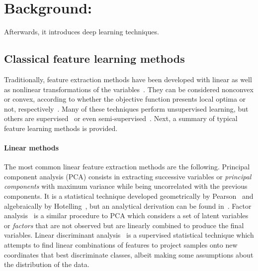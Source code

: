 

\section{Background: }\label{sec:bg}

 Afterwards, it introduces deep learning techniques.

\subsection{Classical feature learning methods}

Traditionally, feature extraction methods have been developed with linear as well as nonlinear transformations of the variables~. They can be considered nonconvex or convex, according to whether the objective function presents local optima or not, respectively~. Many of these techniques perform unsupervised learning, but others are supervised~ or even semi-supervised~. Next, a summary of typical feature learning methods is provided.

\paragraph{Linear methods} The most common linear feature extraction methods are the following. Principal component analysis (PCA) consists in extracting successive variables or \textit{principal components} with maximum variance while being uncorrelated with the previous components. It is a statistical technique developed geometrically by Pearson~ and algebraically by Hotelling~, but an analytical derivation can be found in~. Factor analysis~ is a similar procedure to PCA which considers a set of latent variables or \textit{factors} that are not observed but are linearly combined to produce the final variables. Linear discriminant analysis~ is a supervised statistical technique which attempts to find linear combinations of features to project samples onto new coordinates that best discriminate classes, albeit making some assumptions about the distribution of the data. 

